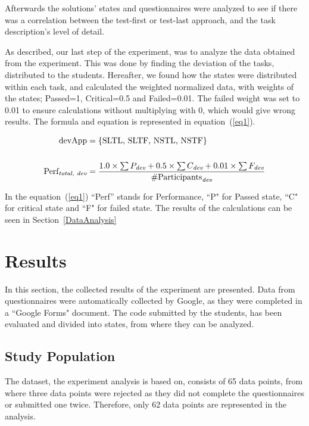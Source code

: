 \documentclass{sig-alternate-05-2015}
\begin{document}
Afterwards the solutions' states and questionnaires were analyzed to see if there was a correlation between the test-first or test-last approach, and the task description's level of detail.

As described, our last step of the experiment, was to ana\-lyze the data obtained from the experiment. This was done by finding the deviation of the tasks, distributed to the students. Hereafter, we found how the states were distributed within each task, and calculated the weighted normalized data, with weights of the states; Passed=1, Critical=0.5 and Failed=0.01. The failed weight was set to 0.01 to ensure calculations without multiplying with 0, which would give wrong results.
The formula and equation is represented in equation~(\ref{eq1}).

\begin{equation}\label{eq1}
\begin{split}
\text{devApp} &= \{\text{SLTL, SLTF, NSTL, NSTF}\} \\
& \\
\text{Perf}_{\emph{total, dev}} &= \dfrac{1.0\times \sum{P_{\emph{dev}}}+0.5\times \sum {C_{\emph{dev}}}+0.01\times \sum{ F_{\emph{dev}}}}{\# \text{Participants}_{\emph{dev}}}
\end{split}
\end{equation}

In the equation~(\ref{eq1}) ``Perf'' stands for Performance, ``P" for Passed state, ``C" for critical state and ``F" for failed state. 
The results of the calculations can be seen in Section~\ref{DataAnalysis}

\section{Results}
\label{sec:Results}
In this section, the collected results of the experiment are presented. Data from questionnaires were automatically collected by Google, as they were completed in a ``Google Forms" document. The code submitted by the students, has been evaluated and divided into states, from where they can be analyzed.

\subsection{Study Population}
\label{DemograpichInformation}
The dataset, the experiment analysis is based on, consists of 65 data points, from where three data points were rejected as they did not complete the questionnaires or submitted one twice. Therefore, only 62 data points are represented in the analysis.
\end{document}
